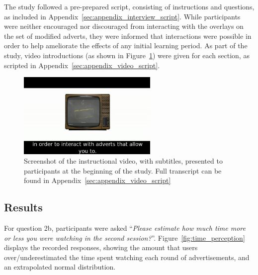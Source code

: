 	The study followed a pre-prepared script, consisting of instructions and questions, as included in Appendix~\ref{sec:appendix_interview_script}. While participants were neither encouraged nor discouraged from interacting with the overlays on the set of modified adverts, they were informed that interactions were possible in order to help ameliorate the effects of any initial learning period. As part of the study, video introductions (as shown in Figure~\ref{fig:insuctional_vid}) were given for each section, as scripted in Appendix~\ref{sec:appendix_video_script}.

	\begin{figure}[!h]
		\centering
		\includegraphics[width=0.6\textwidth]{images/instruction_scr.png}
		\caption{Screenshot of the instructional video, with subtitles, presented to participants at the beginning of the study. Full transcript can be found in Appendix~\ref{sec:appendix_video_script}}
		\label{fig:insuctional_vid}
	\end{figure}

	\subsection{Results}


	For question 2b, participants were asked ``\textit{Please estimate how much time more or less you were watching in the second session?}''. Figure~\ref{fig:time_perception} displays the recorded responses, showing the amount that users over/underestimated the time spent watching each round of advertisements, and an extrapolated normal distribution.

